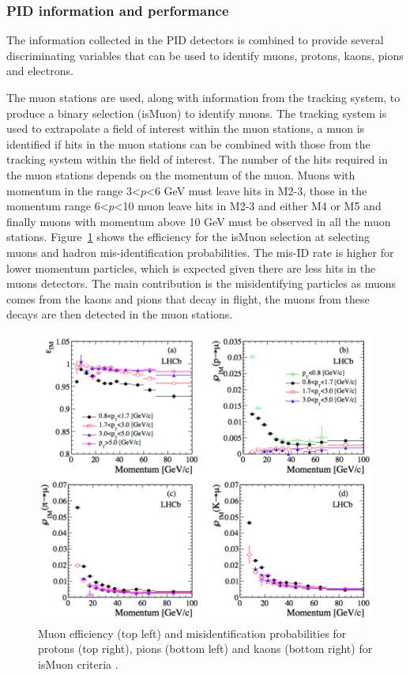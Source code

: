 \subsubsection{PID information and performance}
\label{PID_variables}

The information collected in the PID detectors is combined to provide several discriminating variables that can be used to identify muons, protons, kaons, pions and electrons.

The muon stations are used, along with information from the tracking system, to produce a binary selection (isMuon) to identify muons. The tracking system is used to extrapolate a field of interest within the muon stations, a muon is identified if hits in the muon stations can be combined with those from the tracking system within the field of interest. The number of the hits required in the muon stations depends on the momentum of the muon. Muons with momentum in the range 3<$p$<6 GeV must leave hits in M2-3, those in the momentum range 6<$p$<10 muon leave hits in M2-3 and either M4 or M5 and finally muons with momentum above 10 GeV must be observed in all the muon stations. Figure~\ref{fig:isMuon_efficiency} shows the efficiency for the isMuon selection at selecting muons and hadron mis-identification probabilities. The mis-ID rate is higher for lower momentum particles, which is expected given there are less hits in the muons detectors. The main contribution is the misidentifying particles as muons comes from the kaons and pions that decay in flight, the muons from these decays are then detected in the muon stations.


\begin{figure}[htb] 
  \centering    
  \includegraphics[width=1.0\textwidth]{./Figs/LHC_LHCb/isMuon_eff.png}
  \caption{Muon efficiency (top left) and misidentification probabilities for protons (top right), pions (bottom left) and kaons (bottom right) for isMuon criteria \cite{Archilli:2013npa}.}
  \label{fig:isMuon_efficiency}
\end{figure}




